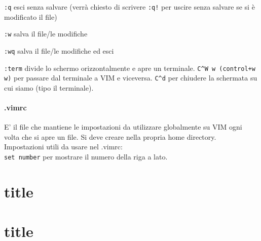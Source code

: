 \documentclass[]{report}
\begin{document}
\verb|:q| esci senza salvare (verrà chiesto di scrivere \verb|:q!| per uscire senza salvare se si è modificato il file)

\verb|:w| salva il file/le modifiche

\verb|:wq| salva il file/le modifiche ed esci

\verb|:term| divide lo schermo orizzontalmente e apre un terminale. \verb|C^W w (control+w w)| per passare dal terminale a VIM e viceversa. \verb|C^d| per chiudere la schermata su cui siamo (tipo il terminale).

\subsubsection{.vimrc}
E' il file che mantiene le impostazioni da utilizzare globalmente su VIM ogni volta che si apre un file. Si deve creare nella propria home directory.\\

Impostazioni utili da usare nel .vimrc:\\
\verb|set number| per  mostrare il numero della riga a lato.\\
\verb||


\chapter{title}
\chapter{title}
\end{document}
